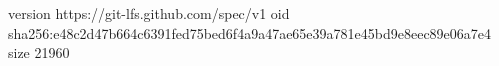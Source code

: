 version https://git-lfs.github.com/spec/v1
oid sha256:e48c2d47b664c6391fed75bed6f4a9a47ae65e39a781e45bd9e8eec89e06a7e4
size 21960
